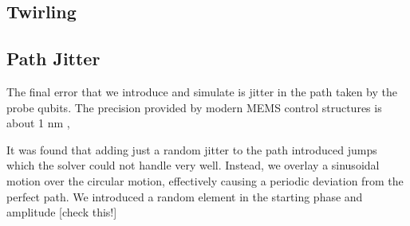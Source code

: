 \documentclass[%
 reprint,
 amsmath,amssymb,
 aps,
]{revtex4-1}
\begin{document}
\subsection{Twirling}

\subsection{Path Jitter}
The final error that we introduce and simulate is jitter in the path taken by the probe qubits. The precision provided by modern MEMS control structures is about 1 nm \cite{MEMS precision}, 

It was found that adding just a random jitter to the path introduced jumps which the solver could not handle very well. Instead, we overlay a sinusoidal motion over the circular motion, effectively causing a periodic deviation from the perfect path. We introduced a random element in the starting phase and amplitude [check this!] 
\end{document}
